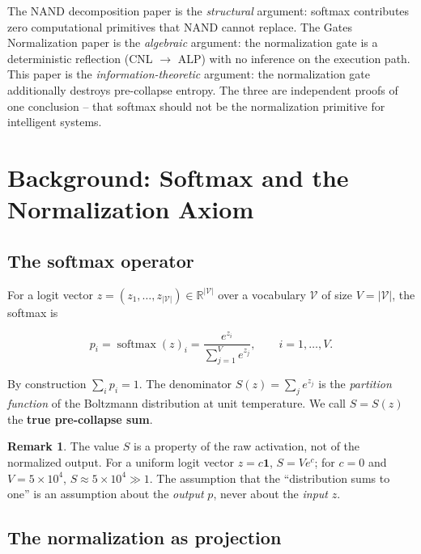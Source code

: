 \documentclass[11pt]{article}
\theoremstyle{definition}
\newtheorem{remark}[theorem]{Remark}
\newcommand{\RR}{\mathbb{R}}
\newcommand{\softmax}{\operatorname{softmax}}
\begin{document}
The NAND decomposition paper \cite{nand2026} is the \emph{structural} argument:
softmax contributes zero computational primitives that NAND cannot replace. The
Gates Normalization paper \cite{gates2026} is the \emph{algebraic} argument:
the normalization gate is a deterministic reflection (CNL $\to$ ALP) with no
inference on the execution path. This paper is the \emph{information-theoretic}
argument: the normalization gate additionally destroys pre-collapse entropy.
The three are independent proofs of one conclusion -- that softmax should not
be the normalization primitive for intelligent systems.

\section{Background: Softmax and the Normalization Axiom}
\label{sec:background}

\subsection{The softmax operator}

For a logit vector $z = (z_1, \dots, z_{|\mathcal{V}|}) \in \RR^{|\mathcal{V}|}$
over a vocabulary $\mathcal{V}$ of size $V = |\mathcal{V}|$, the softmax is

\begin{equation}
  p_i = \softmax(z)_i = \frac{e^{z_i}}{\sum_{j=1}^{V} e^{z_j}},
  \qquad i = 1, \dots, V.
\end{equation}

By construction $\sum_i p_i = 1$. The denominator
$S(z) = \sum_j e^{z_j}$ is the \emph{partition function} of the Boltzmann
distribution at unit temperature. We call $S = S(z)$ the \textbf{true
pre-collapse sum}.

\begin{remark}
  The value $S$ is a property of the raw activation, not of the normalized
  output. For a uniform logit vector $z = c \mathbf{1}$,
  $S = V e^{c}$; for $c = 0$ and $V = 5\times 10^4$, $S \approx 5\times
  10^4 \gg 1$. The assumption that the ``distribution sums to one'' is an
  assumption about the \emph{output} $p$, never about the \emph{input} $z$.
\end{remark}

\subsection{The normalization as projection}
\end{document}
